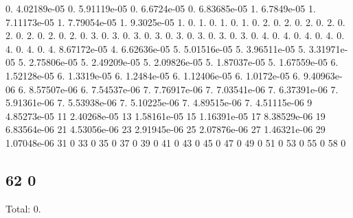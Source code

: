 0. 4.\+02189e-\/05 0. 5.\+91119e-\/05 0. 6.\+6724e-\/05 0. 6.\+83685e-\/05 1. 6.\+7849e-\/05 1. 7.\+11173e-\/05 1. 7.\+79054e-\/05 1. 9.\+3025e-\/05 1. 0. 1. 0. 1. 0. 1. 0. 2. 0. 2. 0. 2. 0. 2. 0. 2. 0. 2. 0. 2. 0. 2. 0. 3. 0. 3. 0. 3. 0. 3. 0. 3. 0. 3. 0. 3. 0. 3. 0. 4. 0. 4. 0. 4. 0. 4. 0. 4. 0. 4. 0. 4. 8.\+67172e-\/05 4. 6.\+62636e-\/05 5. 5.\+01516e-\/05 5. 3.\+96511e-\/05 5. 3.\+31971e-\/05 5. 2.\+75806e-\/05 5. 2.\+49209e-\/05 5. 2.\+09826e-\/05 5. 1.\+87037e-\/05 5. 1.\+67559e-\/05 6. 1.\+52128e-\/05 6. 1.\+3319e-\/05 6. 1.\+2484e-\/05 6. 1.\+12406e-\/05 6. 1.\+0172e-\/05 6. 9.\+40963e-\/06 6. 8.\+57507e-\/06 6. 7.\+54537e-\/06 7. 7.\+76917e-\/06 7. 7.\+03541e-\/06 7. 6.\+37391e-\/06 7. 5.\+91361e-\/06 7. 5.\+53938e-\/06 7. 5.\+10225e-\/06 7. 4.\+89515e-\/06 7. 4.\+51115e-\/06 9 4.\+85273e-\/05 11 2.\+40268e-\/05 13 1.\+58161e-\/05 15 1.\+16391e-\/05 17 8.\+38529e-\/06 19 6.\+83564e-\/06 21 4.\+53056e-\/06 23 2.\+91945e-\/06 25 2.\+07876e-\/06 27 1.\+46321e-\/06 29 1.\+07048e-\/06 31 0 33 0 35 0 37 0 39 0 41 0 43 0 45 0 47 0 49 0 51 0 53 0 55 0 58 0 \subsection*{62 0 }

Total\+: 0. 